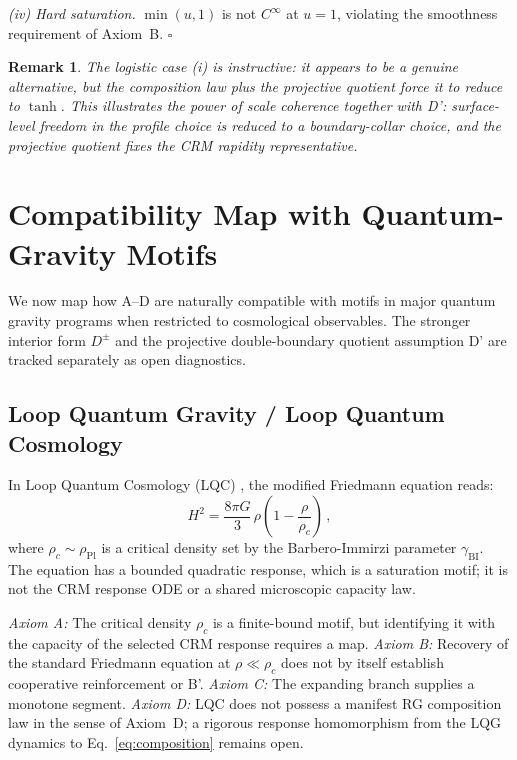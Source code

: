 \documentclass[aps,prd,twocolumn,superscriptaddress,nofootinbib]{revtex4-2}
\newtheorem{remark}{Remark}
\begin{document}
\textit{(iv) Hard saturation.} $\min(u, 1)$ is not $C^\infty$ at $u = 1$, violating the smoothness requirement of Axiom~B. \hfill $\square$

\begin{remark}
The logistic case (i) is instructive: it appears to be a genuine alternative, but the composition law plus the projective quotient force it to reduce to $\tanh$. This illustrates the power of scale coherence together with D': surface-level freedom in the profile choice is reduced to a boundary-collar choice, and the projective quotient fixes the CRM rapidity representative.
\end{remark}


\section{Compatibility Map with Quantum-Gravity Motifs}
\label{sec:qg}

We now map how A--D are naturally compatible with motifs in major quantum gravity programs when restricted to cosmological observables. The stronger interior form $D^\pm$ and the projective double-boundary quotient assumption D' are tracked separately as open diagnostics.

\subsection{Loop Quantum Gravity / Loop Quantum Cosmology}

In Loop Quantum Cosmology (LQC) \cite{Ashtekar2006,Bojowald2008}, the modified Friedmann equation reads:
\begin{equation}
H^2 = \frac{8\pi G}{3}\,\rho\!\left(1 - \frac{\rho}{\rho_c}\right)\,,
\label{eq:lqc_friedmann}
\end{equation}
where $\rho_c \sim \rho_{\mathrm{Pl}}$ is a critical density set by the Barbero-Immirzi parameter $\gamma_{\mathrm{BI}}$. The equation has a bounded quadratic response, which is a saturation motif; it is not the CRM response ODE or a shared microscopic capacity law.

\textit{Axiom A:} The critical density $\rho_c$ is a finite-bound motif, but identifying it with the capacity of the selected CRM response requires a map. \textit{Axiom B:} Recovery of the standard Friedmann equation at $\rho\ll\rho_c$ does not by itself establish cooperative reinforcement or B'. \textit{Axiom C:} The expanding branch supplies a monotone segment. \textit{Axiom D:} LQC does not possess a manifest RG composition law in the sense of Axiom~D; a rigorous response homomorphism from the LQG dynamics to Eq.~\eqref{eq:composition} remains open.
\end{document}
